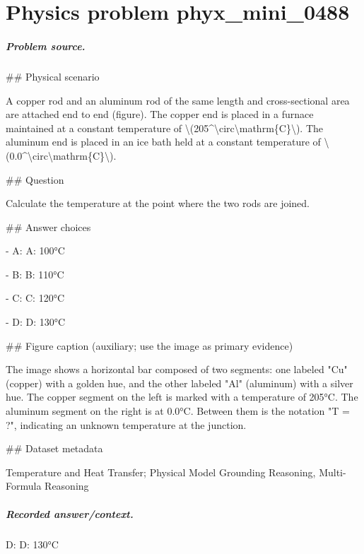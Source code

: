 
\chapter{Physics problem phyx\_mini\_0488}
\label{ch:PhyXMiniProblems_problem_phyx_mini_0488}

\paragraph{Problem source.}
\#\# Physical scenario

A copper rod and an aluminum rod of the same length and cross-sectional area are attached end to end (figure). The copper end is placed in a furnace maintained at a constant temperature of \textbackslash{}(205\textasciicircum{}\textbackslash{}circ\textbackslash{}mathrm\{C\}\textbackslash{}). The aluminum end is placed in an ice bath held at a constant temperature of \textbackslash{}(0.0\textasciicircum{}\textbackslash{}circ\textbackslash{}mathrm\{C\}\textbackslash{}).

\#\# Question

Calculate the temperature at the point where the two rods are joined.

\#\# Answer choices

- A: A: 100°C

- B: B: 110°C

- C: C: 120°C

- D: D: 130°C

\#\# Figure caption (auxiliary; use the image as primary evidence)

The image shows a horizontal bar composed of two segments: one labeled "Cu" (copper) with a golden hue, and the other labeled "Al" (aluminum) with a silver hue. The copper segment on the left is marked with a temperature of 205°C. The aluminum segment on the right is at 0.0°C. Between them is the notation "T = ?", indicating an unknown temperature at the junction.

\#\# Dataset metadata

Temperature and Heat Transfer; Physical Model Grounding Reasoning, Multi-Formula Reasoning

\paragraph{Recorded answer/context.}
D: D: 130°C

